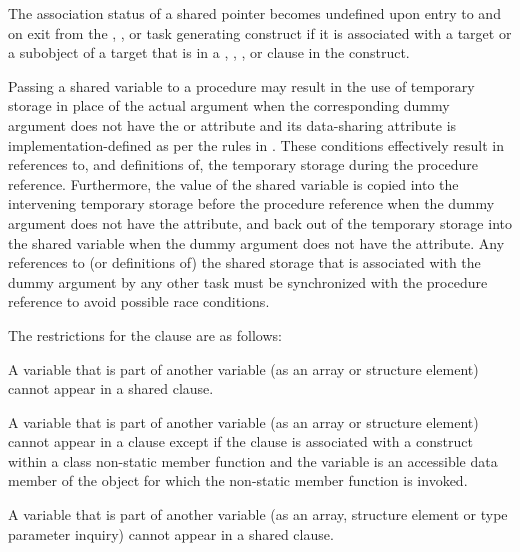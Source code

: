 \begin{fortranspecific}
The association status of a shared pointer becomes undefined upon entry to and on exit
from the , , or task generating construct if it
is associated with a target or a  subobject of a target that is in a ,
, , or  clause in the construct.


\begin{note}
Passing a shared variable to a procedure may result in the use of
temporary storage in place of the actual argument when the corresponding dummy
argument does not have the  or  attribute and its data-sharing attribute
is implementation-defined as per the rules in
.
These conditions effectively result in references to, and definitions of, the
temporary storage during the procedure reference.  Furthermore, the value of
the shared variable is copied into the intervening temporary storage before the procedure
reference when the dummy argument does not have the 
attribute, and back out of the temporary storage into the shared variable when
the dummy argument does not have the  attribute.  Any
references to (or definitions of) the shared storage that is associated with
the dummy argument by any other task must be synchronized with
the procedure reference to avoid possible race conditions.

\end{note}
\medskip
\end{fortranspecific}


\restrictions
The restrictions for the  clause are as follows:
\begin{itemize}
%
\begin{cspecific}
\item A variable that is part of another variable (as an array or structure element) cannot appear in a shared clause.
\end{cspecific}
%
\begin{cppspecific}
\item A variable that is part of another variable (as an array or structure
  element) cannot appear in a  clause except if the 
  clause is associated with a construct within a class non-static member
  function and the variable is an accessible data member of the object for
  which the non-static member function is invoked.
\end{cppspecific}
%
\begin{fortranspecific}
\item A variable that is part of another variable (as an array, structure element or type parameter inquiry) cannot appear in a shared clause.
\end{fortranspecific}
%
\end{itemize}








